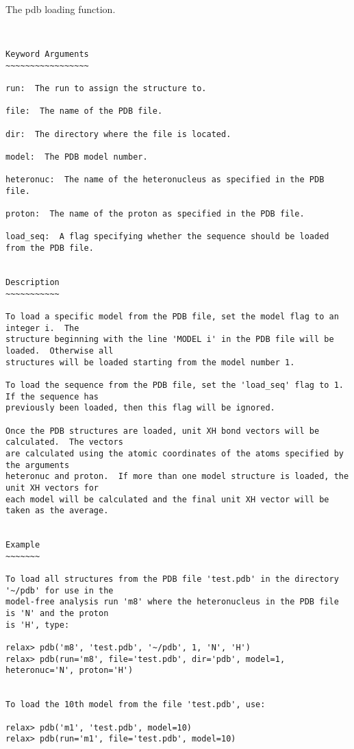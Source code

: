 The pdb loading function.
\scriptsize
\begin{verbatim}


Keyword Arguments
~~~~~~~~~~~~~~~~~

run:  The run to assign the structure to.

file:  The name of the PDB file.

dir:  The directory where the file is located.

model:  The PDB model number.

heteronuc:  The name of the heteronucleus as specified in the PDB file.

proton:  The name of the proton as specified in the PDB file.

load_seq:  A flag specifying whether the sequence should be loaded from the PDB file.


Description
~~~~~~~~~~~

To load a specific model from the PDB file, set the model flag to an integer i.  The
structure beginning with the line 'MODEL i' in the PDB file will be loaded.  Otherwise all
structures will be loaded starting from the model number 1.

To load the sequence from the PDB file, set the 'load_seq' flag to 1.  If the sequence has
previously been loaded, then this flag will be ignored.

Once the PDB structures are loaded, unit XH bond vectors will be calculated.  The vectors
are calculated using the atomic coordinates of the atoms specified by the arguments
heteronuc and proton.  If more than one model structure is loaded, the unit XH vectors for
each model will be calculated and the final unit XH vector will be taken as the average.


Example
~~~~~~~

To load all structures from the PDB file 'test.pdb' in the directory '~/pdb' for use in the
model-free analysis run 'm8' where the heteronucleus in the PDB file is 'N' and the proton
is 'H', type:

relax> pdb('m8', 'test.pdb', '~/pdb', 1, 'N', 'H')
relax> pdb(run='m8', file='test.pdb', dir='pdb', model=1, heteronuc='N', proton='H')


To load the 10th model from the file 'test.pdb', use:

relax> pdb('m1', 'test.pdb', model=10)
relax> pdb(run='m1', file='test.pdb', model=10)


\end{verbatim}

\normalsize
